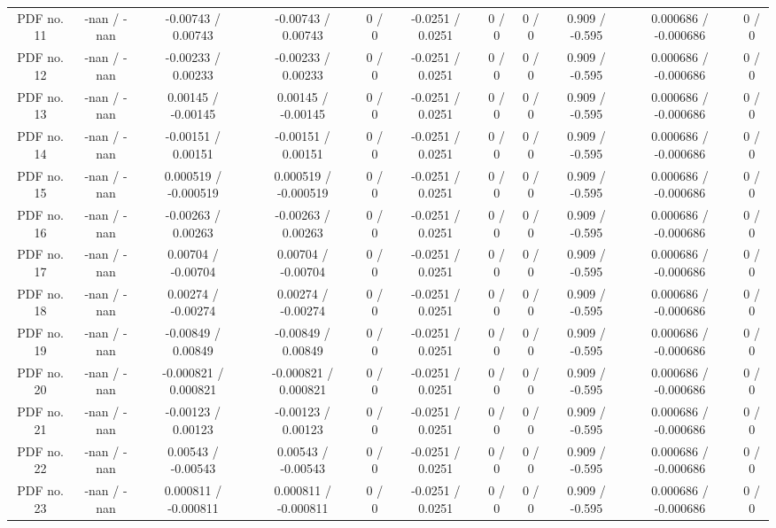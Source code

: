 \begin{table}[htbp]
\begin{center}
\begin{tabular}{|c|c|c|c|c|c|c|c|c|c|c|}
  PDF no. 11 & -nan / -nan & -0.00743 / 0.00743 & -0.00743 / 0.00743 & 0 / 0 & -0.0251 / 0.0251 & 0 / 0 & 0 / 0 & 0.909 / -0.595 & 0.000686 / -0.000686 & 0 / 0 \\ 
  PDF no. 12 & -nan / -nan & -0.00233 / 0.00233 & -0.00233 / 0.00233 & 0 / 0 & -0.0251 / 0.0251 & 0 / 0 & 0 / 0 & 0.909 / -0.595 & 0.000686 / -0.000686 & 0 / 0 \\ 
  PDF no. 13 & -nan / -nan & 0.00145 / -0.00145 & 0.00145 / -0.00145 & 0 / 0 & -0.0251 / 0.0251 & 0 / 0 & 0 / 0 & 0.909 / -0.595 & 0.000686 / -0.000686 & 0 / 0 \\ 
  PDF no. 14 & -nan / -nan & -0.00151 / 0.00151 & -0.00151 / 0.00151 & 0 / 0 & -0.0251 / 0.0251 & 0 / 0 & 0 / 0 & 0.909 / -0.595 & 0.000686 / -0.000686 & 0 / 0 \\ 
  PDF no. 15 & -nan / -nan & 0.000519 / -0.000519 & 0.000519 / -0.000519 & 0 / 0 & -0.0251 / 0.0251 & 0 / 0 & 0 / 0 & 0.909 / -0.595 & 0.000686 / -0.000686 & 0 / 0 \\ 
  PDF no. 16 & -nan / -nan & -0.00263 / 0.00263 & -0.00263 / 0.00263 & 0 / 0 & -0.0251 / 0.0251 & 0 / 0 & 0 / 0 & 0.909 / -0.595 & 0.000686 / -0.000686 & 0 / 0 \\ 
  PDF no. 17 & -nan / -nan & 0.00704 / -0.00704 & 0.00704 / -0.00704 & 0 / 0 & -0.0251 / 0.0251 & 0 / 0 & 0 / 0 & 0.909 / -0.595 & 0.000686 / -0.000686 & 0 / 0 \\ 
  PDF no. 18 & -nan / -nan & 0.00274 / -0.00274 & 0.00274 / -0.00274 & 0 / 0 & -0.0251 / 0.0251 & 0 / 0 & 0 / 0 & 0.909 / -0.595 & 0.000686 / -0.000686 & 0 / 0 \\ 
  PDF no. 19 & -nan / -nan & -0.00849 / 0.00849 & -0.00849 / 0.00849 & 0 / 0 & -0.0251 / 0.0251 & 0 / 0 & 0 / 0 & 0.909 / -0.595 & 0.000686 / -0.000686 & 0 / 0 \\ 
  PDF no. 20 & -nan / -nan & -0.000821 / 0.000821 & -0.000821 / 0.000821 & 0 / 0 & -0.0251 / 0.0251 & 0 / 0 & 0 / 0 & 0.909 / -0.595 & 0.000686 / -0.000686 & 0 / 0 \\ 
  PDF no. 21 & -nan / -nan & -0.00123 / 0.00123 & -0.00123 / 0.00123 & 0 / 0 & -0.0251 / 0.0251 & 0 / 0 & 0 / 0 & 0.909 / -0.595 & 0.000686 / -0.000686 & 0 / 0 \\ 
  PDF no. 22 & -nan / -nan & 0.00543 / -0.00543 & 0.00543 / -0.00543 & 0 / 0 & -0.0251 / 0.0251 & 0 / 0 & 0 / 0 & 0.909 / -0.595 & 0.000686 / -0.000686 & 0 / 0 \\ 
  PDF no. 23 & -nan / -nan & 0.000811 / -0.000811 & 0.000811 / -0.000811 & 0 / 0 & -0.0251 / 0.0251 & 0 / 0 & 0 / 0 & 0.909 / -0.595 & 0.000686 / -0.000686 & 0 / 0 \\ 

\end{tabular}
\end{center}
\end{table}
